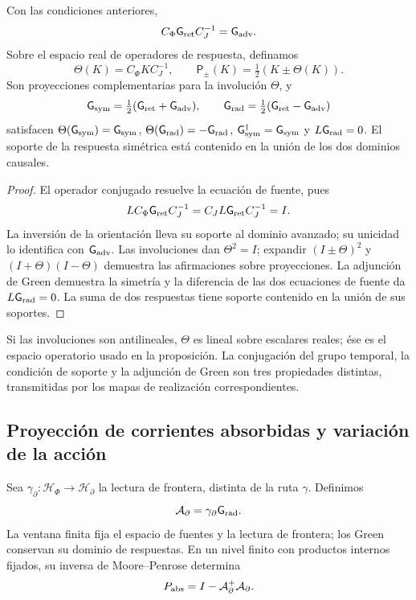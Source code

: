 \begin{proposition}
\label{vii:prop:green-paridades}
Con las condiciones anteriores,
\[
 C_\Phi \mathsf{G}_{\rm ret}C_J^{-1}=\mathsf{G}_{\rm adv}.
\]
Sobre el espacio real de operadores de respuesta, definamos
\[
 \Theta(K)=C_\Phi K C_J^{-1},\qquad
 \mathsf P_\pm(K)=\tfrac12(K\pm\Theta(K)).
\]
Son proyecciones complementarias para la involución \(\Theta\), y
\begin{equation}
 \mathsf{G}_{\rm sym}=\tfrac12(\mathsf{G}_{\rm ret}+\mathsf{G}_{\rm adv}),\qquad
 \mathsf{G}_{\rm rad}=\tfrac12(\mathsf{G}_{\rm ret}-\mathsf{G}_{\rm adv})
 \label{vii:eq:descomposicion-green}
\end{equation}
satisfacen \(\Theta(\mathsf{G}_{\rm sym})=\mathsf{G}_{\rm sym}\),
\(\Theta(\mathsf{G}_{\rm rad})=-\mathsf{G}_{\rm rad}\),
\(\mathsf{G}_{\rm sym}^{\dagger}=\mathsf{G}_{\rm sym}\) y
\(L\mathsf{G}_{\rm rad}=0\). El soporte de la respuesta simétrica está contenido
en la unión de los dos dominios causales.
\end{proposition}
\begin{proof}
El operador conjugado resuelve la ecuación de fuente, pues
\[
 LC_\Phi \mathsf{G}_{\rm ret}C_J^{-1}=C_JL\mathsf{G}_{\rm ret}C_J^{-1}=I.
\]
La inversión de la orientación lleva su soporte al dominio avanzado;
su unicidad lo identifica con \(\mathsf{G}_{\rm adv}\). Las involuciones dan
\(\Theta^2=I\); expandir \((I\pm\Theta)^2\) y
\((I+\Theta)(I-\Theta)\) demuestra las afirmaciones sobre proyecciones.
La adjunción de Green demuestra la simetría y la diferencia de las dos
ecuaciones de fuente da \(L\mathsf{G}_{\rm rad}=0\). La suma de dos respuestas
tiene soporte contenido en la unión de sus soportes.
\end{proof}

Si las involuciones son antilineales, \(\Theta\) es lineal sobre
escalares reales; ése es el espacio operatorio usado en la proposición.
La conjugación del grupo temporal, la condición de soporte y la
adjunción de Green son tres propiedades distintas, transmitidas por los
mapas de realización correspondientes.

\subsection{Proyección de corrientes absorbidas y variación de la acción}
\label{vii:subsec:proyeccion-absorcion}

Sea \(\gamma_\partial:\mathcal H_\Phi\to\mathcal H_\partial\)
la lectura de frontera, distinta de la ruta \(\gamma\). Definimos
\[
 \mathcal A_\partial=\gamma_\partial \mathsf{G}_{\rm rad}.
\]
La ventana finita fija el espacio de fuentes y la lectura de frontera;
los Green conservan su dominio de respuestas. En un nivel finito con
productos internos fijados, su inversa de
Moore--Penrose determina
\begin{equation}
 P_{\rm abs}=I-\mathcal A_\partial^+\mathcal A_\partial.
 \label{vii:eq:proyector-absorcion}
\end{equation}

